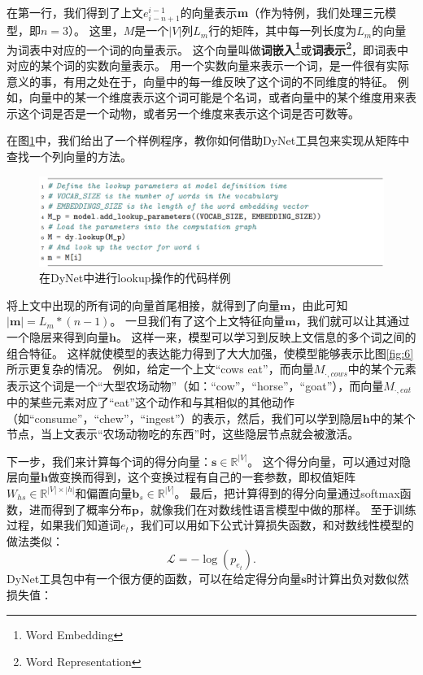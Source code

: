 \documentclass[10pt,a4paper]{ctexart}
\begin{document}
在第一行，我们得到了上文$e_{i-n+1}^{i-1}$的向量表示\textbf{m}（作为特例，我们处理三元模型，即$n=3$）。
这里，$M$是一个$|V|$列$L_m$行的矩阵，其中每一列长度为$L_m$的向量为词表中对应的一个词的向量表示。
这个向量叫做\textbf{词嵌入\footnote{Word Embedding}}或\textbf{词表示\footnote{Word Representation}}，即词表中对应的某个词的实数向量表示。
用一个实数向量来表示一个词，是一件很有实际意义的事，有用之处在于，向量中的每一维反映了这个词的不同维度的特征。
例如，向量中的某一个维度表示这个词可能是个名词，或者向量中的某个维度用来表示这个词是否是一个动物，或者另一个维度来表示这个词是否可数等。

在图\ref{fig:13}中，我们给出了一个样例程序，教你如何借助DyNet工具包来实现从矩阵中查找一个列向量的方法。

\begin{figure}[H]
\centering
\includegraphics[width=1\textwidth]{fig13.png}
\caption{在DyNet中进行lookup操作的代码样例}
\label{fig:13}
\end{figure}

将上文中出现的所有词的向量首尾相接，就得到了向量$\textbf{m}$，由此可知$|\textbf{m}|=L_m * (n-1)$。
一旦我们有了这个上文特征向量$\textbf{m}$，我们就可以让其通过一个隐层来得到向量$\textbf{h}$。
这样一来，模型可以学习到反映上文信息的多个词之间的组合特征。
这样就使模型的表达能力得到了大大加强，使模型能够表示比图\ref{fig:6}所示更复杂的情况。
例如，给定一个上文“cows eat”，而向量$M_{\cdot,cows}$中的某个元素表示这个词是一个“大型农场动物”（如：“cow”，“horse”，“goat”），而向量$M_{\cdot,eat}$中的某些元素对应了“eat”这个动作和与其相似的其他动作（如“consume”，“chew”，“ingest”）的表示，然后，我们可以学到隐层$\textbf{h}$中的某个节点，当上文表示“农场动物吃的东西”时，这些隐层节点就会被激活。

下一步，我们来计算每个词的得分向量：$\textbf{s} \in \mathbb{R}^{|V|}$。
这个得分向量，可以通过对隐层向量$\textbf{h}$做变换而得到，这个变换过程有自己的一套参数，即权值矩阵$W_{hs} \in \mathbb{R}^{|V| \times |h|}$和偏置向量$\textbf{b}_s \in \mathbb{R}^{|V|}$。
最后，把计算得到的得分向量通过softmax函数，进而得到了概率分布$\textbf{p}$，就像我们在对数线性语言模型中做的那样。
至于训练过程，如果我们知道词$e_t$，我们可以用如下公式计算损失函数，和对数线性模型的做法类似：
\begin{equation}\label{eq:43}
 \mathcal{L} = - \log (p_{e_t}).
\end{equation}
DyNet工具包中有一个很方便的函数，可以在给定得分向量$\textbf{s}$时计算出负对数似然损失值：
\end{document}
